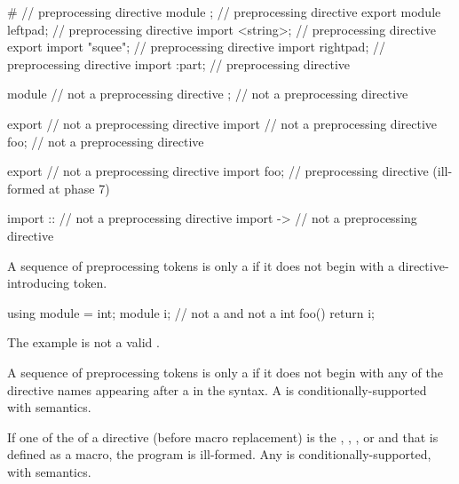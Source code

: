 \begin{example}
\begin{codeblock}
#                       // preprocessing directive
module ;                // preprocessing directive
export module leftpad;  // preprocessing directive
import <string>;        // preprocessing directive
export import "squee";  // preprocessing directive
import rightpad;        // preprocessing directive
import :part;           // preprocessing directive

module                  // not a preprocessing directive
;                       // not a preprocessing directive

export                  // not a preprocessing directive
import                  // not a preprocessing directive
foo;                    // not a preprocessing directive

export                  // not a preprocessing directive
import foo;             // preprocessing directive (ill-formed at phase 7)

import ::               // not a preprocessing directive
import ->               // not a preprocessing directive
\end{codeblock}
\end{example}

\pnum
A sequence of preprocessing tokens is only a 
if it does not begin with a directive-introducing token.
\begin{example}
\begin{codeblock}
using module = int;
module i;               // not a  and not a 
int foo() {
  return i;
}
\end{codeblock}
The example is not a valid .
\end{example}
A sequence of preprocessing tokens is only a 
if it does not begin with any of the directive names
appearing after a \tcode{\#} in the syntax.
A  is
conditionally-supported with
semantics.

\pnum
If one of the  of a  directive
(before macro replacement) is the 
, , , or 
and that  is defined
as a macro, the program is ill-formed.
Any  is conditionally-supported,
with  semantics.

